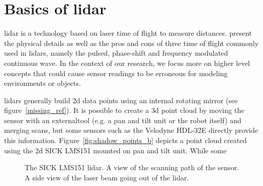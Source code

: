 \section{Basics of \gls{lidar}}
\label{sec:chap_lidar_basics}

\gls{lidar} is a technology based on laser time of flight to measure distances. \citet{lidar_basics} present the physical details as well as the pros and cons of three time of flight commonly used in \gls{lidar}s, namely the pulsed, phase-shift and frequency modulated continuous wave. In the context of our research, we focus more on higher level concepts that could cause sensor readings to be erroneous for modeling environments or objects. 

\gls{lidar}s generally build \gls{2d} data points using an internal rotating mirror (see figure~\ref{missing_ref}). It is possible to create a \gls{3d} point cloud by moving the sensor with an externaltool (e.g. a pan and tilt unit or the robot itself) and merging scans, but some sensors such as the Velodyne HDL-32E directly provide this information. Figure~\ref{fig:shadow_points_b} depicts a point cloud created using the \gls{2d} SICK LMS151 mounted on pan and tilt unit. While some

\begin{figure}[htpb]
    \centering
    \caption{\protect{} The SICK LMS151 \gls{lidar}. \protect{} A view of the scanning path of the sensor. \protect{} A side view of the laser beam going out of the \gls{lidar}.}
    \label{fig:lidar_basics}
\end{figure}

